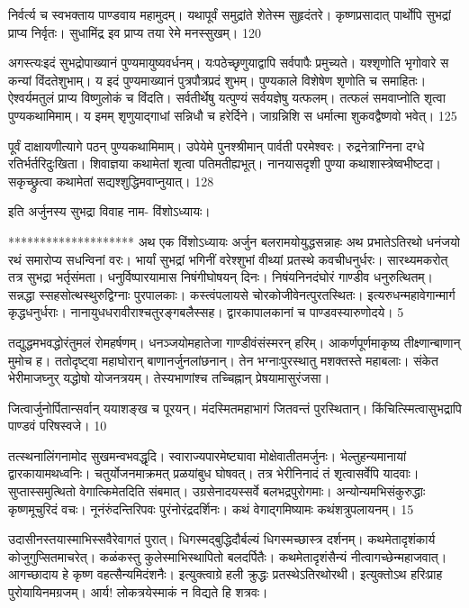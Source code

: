 निर्वर्त्य च स्वभक्ताय पाण्डवाय महामुदम्।
यथापूर्वं समुद्रांते शेतेस्म सुहृदंतरे।
कृष्णप्रसादात् पार्थोपि सुभद्रां प्राप्य निर्वृतः।
सुधामिंद्र इव प्राप्य तया रेमे मनस्सुखम्।
120

अगस्त्यःइदं सुभद्रोपाख्यानं पुण्यमायुष्यवर्धनम्।
यःपठेच्छृणुयाद्वापि सर्वपापैः प्रमुच्यते।
यश्शृणोति भृगोवारे स कन्यां विंदतेशुभाम्।
य इदं पुण्यमाख्यानं पुत्रपौत्रप्रदं शुभम्।
पुण्यकाले विशेषेण शृणोति च समाहितः।
ऐश्वर्यमतुलं प्राप्य विष्णुलोकं च विंदति।
सर्वतीर्थेषु यत्पुण्यं सर्वयज्ञेषु यत्फलम्।
तत्फलं समवाप्नोति शृत्वा पुण्यकथामिमाम्।
य इमम् शृणुयाद्गाधां सन्निधौ च हरेर्दिने।
जाग्रन्निशि स धर्मात्मा शुकवद्वैष्णवो भवेत्।
125

पूर्वं दाक्षायणीत्यागे पठन् पुण्यकथामिमाम्।
उपेयेमे पुनश्श्रीमान् पार्वती परमेश्वरः।
रुद्रनेत्राग्निना दग्धे रतिर्भर्तरिदुःखिता।
शिवाज्ञया कथामेतां शृत्वा पतिमतीह्यभूत्।
नानयासदृशी पुण्या कथाशास्त्रेष्वभीष्टदा।
सकृच्छ्रुत्वा कथामेतां सद्यश्शुद्धिमवाप्नुयात्।
128

इति अर्जुनस्य सुभद्रा विवाह नाम- विंशोऽध्यायः।

********************
अथ एक विंशोऽध्यायः
अर्जुन बलरामयोयुद्धसन्नाहः अथ प्रभातेऽतिरथो धनंजयो रथं
समारोप्य सधन्विनां वरः।
भार्यां सुभद्रां भगिनीं वरेश्शुभां वीथ्यां
प्रतस्थे कवचीधनुर्धरः।
सारथ्यमकरोत् तत्र सुभद्रा भर्तृसंमता।
धनुर्विष्पारयामास निषंगीघोषयन् दिनः।
निषंयनिनदंघोरं गाण्डीव धनुरुत्थितम्।
सन्नद्धा स्सहसोत्थस्थुरुद्विग्नाः पुरपालकाः।
कस्त्वंपलायसे चोरकोजीवेनत्पुरतस्थितः।
इत्यरुधन्महावेगान्मार्ग कृद्धधनुर्धराः।
नानायुधधरावीराश्चतुरङ्गबलैस्सह।
द्वारकापालकानां च पाण्डवस्यारुणोदये।
5

तद्युद्धमभवद्धोरंतुमलं रोमहर्षणम्।
धनञ्जयोमहातेजा गाण्डीवंसंस्मरन् हरिम्।
आकर्णपूर्णमाकृष्य तीक्ष्णान्बाणान् मुमोच ह।
ततोदृष्ट्वा महाघोरान् बाणानर्जुनलांछनान्।
तेन भग्नाःपुरस्थातु मशक्तस्ते महाबलाः।
संकेत भेरीमाजघ्नुर् यद्धोषो योजनत्रयम्।
तेस्यभाणांश्च तच्चिह्नान् प्रेषयामासुरंजसा।

जित्वार्जुनोर्पितान्सर्वान् ययाशङ्ख च पूरयन्।
मंदस्मितमहाभागं जितवन्तं पुरस्थितान्।
किंचित्स्मित्वासुभद्रापि पाण्डवं परिषस्वजे।
10

तत्स्थनालिंगनामोद सुखमन्वभवद्धृदि।
स्वाराज्यपारमेष्ट्यावा मोक्षेवातीतमर्जुनः।
भेल्तुहन्यमानायां द्वारकायामथध्वनिः।
चतुर्योजनमाक्रमत् प्रळयांबुध घोषवत्।
तत्र भेरीनिनादं तं शृत्वासर्वेपि यादवाः।
सुप्तास्समुत्थितो वेगात्किमेतदिति संबमात्।
उग्रसेनादयस्सर्वे बलभद्रपुरोगमाः।
अन्योन्यमभिसंकुरुद्धाः कृष्णमूचुरिदं वचः।
नूनंरुंदन्तिरिपवः पुरंनोरंद्रदर्शिनः।
कथं वेगाद्गमिष्यामः कथंशत्रुपलायनम्।
15

उदासीनस्तयास्माभिस्सवैरेवागतं पुरात्।
धिगस्मद्बुद्धिदौर्बल्यं धिगस्मच्छास्त्र दर्शनम्।
कथमेतादृशंकार्य कोजुगुप्सितमाचरेत्।
कळंकस्तु कुलेस्माभिस्थापितो बलदर्पितैः।
कथमेतादृशंसैन्यं नीत्वागच्छेन्महाजवात्।
आगच्छादाय हे कृष्ण वहत्सैन्यमिदंशनैः।
इत्युक्त्वाग्रे हली क्रुद्धः प्रतस्थेऽतिरथोरथी।
इत्युक्तोऽथ हरिःप्राह पुरोयायिनमग्रजम्।
आर्य! लोकत्रयेस्माकं न विद्यते हि शत्रवः।

